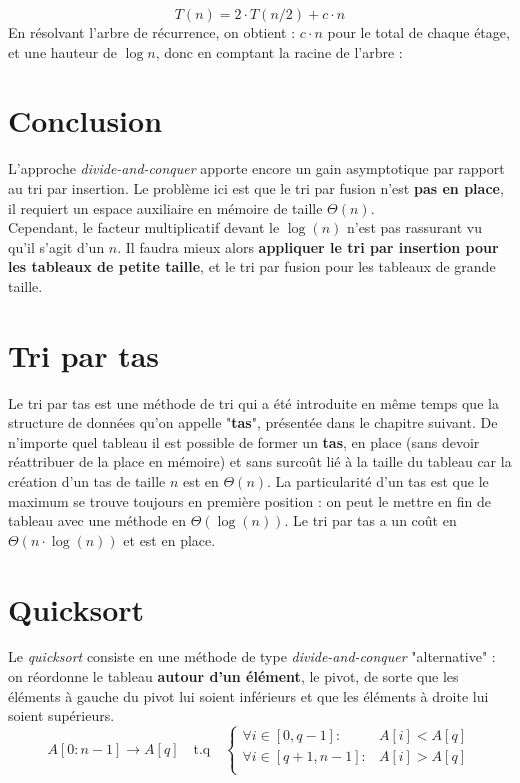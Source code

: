 \documentclass[12pt,a4paper]{book}
\newcommand{\divc}{\textit{divide-and-conquer} }
\begin{document}
$$\boxed{T(n) = 2\cdot T(n/2) + c\cdot n}$$
En résolvant l'arbre de récurrence, on obtient : $c\cdot n$ pour le total de chaque étage, et une hauteur de $\log n$, donc en comptant la racine de l'arbre :

\section{Conclusion}
L'approche \divc apporte encore un gain asymptotique par rapport au tri par insertion. Le problème ici est que le tri par fusion n'est \textbf{pas en place}, il requiert un espace auxiliaire en mémoire de taille $\Theta(n)$. \\

Cependant, le facteur multiplicatif devant le $\log(n)$ n'est pas rassurant vu qu'il s'agit d'un $n$. Il faudra mieux alors \textbf{appliquer le tri par insertion pour les tableaux de petite taille}, et le tri par fusion pour les tableaux de grande taille.
\section{Tri par tas}
Le tri par tas est une méthode de tri qui a été introduite en même temps que la structure de données qu'on appelle "\textbf{tas}", présentée dans le chapitre suivant. De n'importe quel tableau il est possible de former un \textbf{tas}, en place (sans devoir réattribuer de la place en mémoire) et sans surcoût lié à la taille du tableau car la création d'un tas de taille $n$ est en $\Theta(n)$. La particularité d'un tas est que le maximum se trouve toujours en première position : on peut le mettre en fin de tableau avec une méthode en $\Theta(\log (n))$. Le tri par tas a un coût en $\Theta(n\cdot\log (n))$ et est en place.
\section{Quicksort}
Le \textit{quicksort} consiste en une méthode de type \divc "alternative" : on réordonne le tableau \textbf{autour d'un élément}, le pivot, de sorte que les éléments à gauche du pivot lui soient inférieurs et que les éléments à droite lui soient supérieurs.
$$A[0:n-1] \longrightarrow A[q] \quad \text{t.q} \quad \left\{\begin{array}{ll}
\forall i \in [0,q-1] : &A[i] < A[q] \\
\forall i \in [q+1,n-1] : &A[i] > A[q] \\
\end{array}\right.$$
\end{document}
